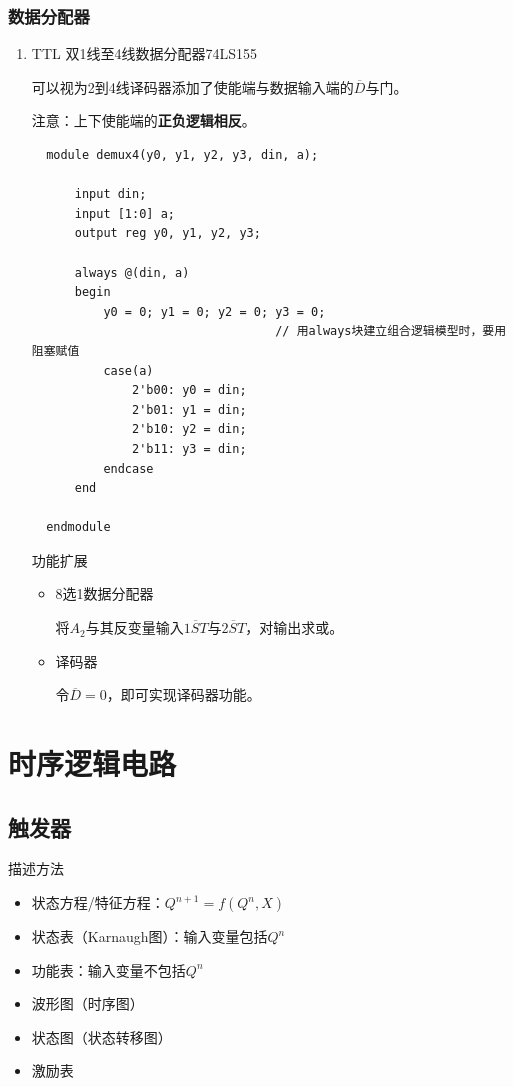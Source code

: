 \documentclass[UTF8,fontset=fandol,zihao=5]{ctexart}
\begin{document}
\subsubsection{数据分配器}

\begin{enumerate}
  \item TTL 双1线至4线数据分配器74LS155
  
  可以视为2到4线译码器添加了使能端与数据输入端的$\overline{D}$与门。

  注意：上下使能端的\textbf{正负逻辑相反}。

  \begin{verbatim}
  module demux4(y0, y1, y2, y3, din, a);

      input din;
      input [1:0] a;
      output reg y0, y1, y2, y3;

      always @(din, a)
      begin
          y0 = 0; y1 = 0; y2 = 0; y3 = 0;
                                  // 用always块建立组合逻辑模型时，要用阻塞赋值
          case(a)
              2'b00: y0 = din;
              2'b01: y1 = din;
              2'b10: y2 = din;
              2'b11: y3 = din;
          endcase
      end

  endmodule
  \end{verbatim}

  功能扩展
  \begin{itemize}
    \item 8选1数据分配器
    
    将$A_2$与其反变量输入$\overline{1ST}$与$\overline{2ST}$，对输出求或。

    \item 译码器
    
    令$\overline{D}=0$，即可实现译码器功能。
  \end{itemize}
\end{enumerate}

\section{时序逻辑电路}

\subsection{触发器}

描述方法
  
\begin{itemize}
  \item 状态方程/特征方程：$Q^{n+1}=f(Q^n, X)$
  \item 状态表（Karnaugh图）：输入变量包括$Q^n$
  \item 功能表：输入变量不包括$Q^n$
  \item 波形图（时序图）
  \item 状态图（状态转移图）
  \item 激励表
\end{itemize}
\end{document}
